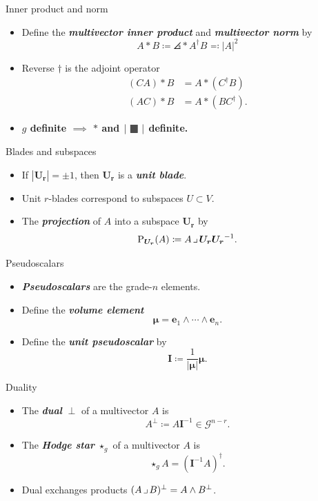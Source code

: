 \documentclass[aspectratio=169]{beamer}
\makeatletter
\newcommand\boldgreen[1]{\textcolor{lighter_csu_green}{\emph{\textbf{#1}}}}
\newcommand\boldgold[1]{\textcolor{csu_gold}{\textbf{#1}}}
\newcommand{\G}{\mathcal{G}}
\newcommand{\projection}{\operatorname{P}}
\newcommand{\blade}[1]{\boldsymbol{#1}}
\newcommand{\pseudoscalar}{\blade{I}}
\newcommand{\contract}{\hspace*{.5mm} \lrcorner \hspace*{.5mm}}
\DeclarePairedDelimiter\angles{\langle}{\rangle}
\newcommand{\proj}[2]{\angles*{#2}_{#1}}
\def\mathcolor#1#{\@mathcolor{#1}}
\def\@mathcolor#1#2#3{%
  \protect\leavevmode
  \begingroup
    \color#1{#2}#3%
  \endgroup
}
\newcommand{\blank}{\raisebox{-.3ex}{\mathcolor{light-gray}{\text{\large$\blacksquare$}}}}
\makeatother
\begin{document}
\begin{frame}{Inner product and norm}
\vfill
\begin{itemize}
\pause
\item Define the \boldgreen{multivector inner product} and \boldgreen{multivector norm} by
\[
A \ast B \coloneqq \proj{}{A^\dagger B} \eqqcolon |A|^2
\]
\pause
\item Reverse $\dagger$ is the adjoint operator
\begin{align*}
(CA) \ast B &= A \ast (C^\dagger B)\\
(AC) \ast B &= A \ast (BC^\dagger).
\end{align*}
\pause
\item \boldgold{$g$ definite $\implies$ $\ast$ and $|\blank|$ definite.}
\end{itemize}
\vfill
\end{frame}

\begin{frame}{Blades and subspaces}
\vfill
\begin{itemize}
\pause
\item If $|\blade{U_r}|=\pm 1$, then $\blade{U_r}$ is a \boldgreen{unit blade}.
\pause
\item Unit $r$-blades correspond to subspaces $U\subset V$.
\pause
\item The \boldgreen{projection} of $A$ into a subspace $\blade{U_r}$ by
\[
\projection_{\blade{U_r}} (A) \coloneqq A\contract \blade{U_r}\blade{U_r}^{-1}.
\]
\end{itemize}
\vfill
\end{frame}

\begin{frame}{Pseudoscalars}
\vfill
\begin{itemize}
\pause
\item \boldgreen{Pseudoscalars} are the grade-$n$ elements.
\pause
\item Define the \boldgreen{volume element}
\[
\blade{\mu} = \blade{e}_1 \wedge \cdots \wedge \blade{e}_n.
\]
\pause
\item Define the \boldgreen{unit pseudoscalar} by
\[
\pseudoscalar \coloneqq \frac{1}{|\blade{\mu}|} \blade{\mu}.
\]
\end{itemize}
\vfill
\end{frame}

\begin{frame}{Duality}
\vfill
\begin{itemize}
\pause
\item The \boldgreen{dual} \boldgold{$\perp$} of a multivector $A$ is
\[
A^\perp \coloneqq A \pseudoscalar^{-1} \in \G^{n-r}.
\]
\pause
\item The \boldgreen{Hodge star} \boldgold{$\star_g$} of a multivector $A$ is
\[
\star_g A = (\pseudoscalar^{-1}A)^\dagger.
\]
\pause
\item Dual exchanges products $(A \contract B)^\perp = A \wedge B^\perp$.
\end{itemize}
\vfill
\end{frame}
\end{document}
